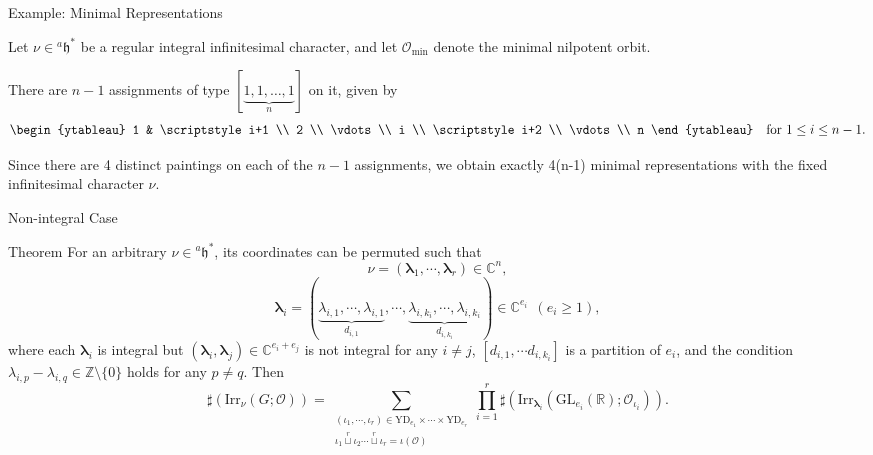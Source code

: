 \documentclass[fleqn,xcolor=dvipsnames]{beamer}
\newcommand{\blam}{{\boldsymbol{\lambda}}}
\newcommand{\BC}{{\mathbb {C}}}
\newcommand{\BR}{{\mathbb {R}}}
\newcommand{\BZ}{{\mathbb {Z}}}
\newcommand{\CO}{{\mathcal {O}}}
\newcommand{\fh}{\mathfrak{h}}
\newcommand{\GL}{{\mathrm{GL}}}
\newcommand{\Irr}{{\mathrm{Irr}}}
\begin{document}
\begin{frame}{Example: Minimal Representations}

Let \( \nu \in {^a\mathfrak{h}}^* \) be a regular integral infinitesimal character, and let \( \mathcal{O}_{\mathrm{min}} \) denote the minimal nilpotent orbit.

\medskip

There are \( n-1 \) assignments of type \( [\underbrace{1, 1, \dots, 1}_n] \) on it, given by
\[
\begin{ytableau}
    1 & \scriptstyle i+1 \\
    2 \\
    \vdots \\
    i \\
    \scriptstyle i+2 \\
    \vdots \\
    n
\end{ytableau}
\quad \text{for } 1 \leq i \leq n-1.
\]

\medskip

Since there are 4 distinct paintings on each of the \( n-1 \) assignments, we obtain exactly \alert{4(n-1) minimal representations}   with the fixed infinitesimal character \( \nu \).

\end{frame}






\begin{frame}{Non-integral Case}
  \begin{block}{Theorem}
    For an arbitrary $\nu \in {^{a}\fh}^*$, its coordinates can be permuted such that 
        \[
        \nu = (\blam_1, \cdots, \blam_r) \in \BC^n,
        \]
        \[
        \blam_i = (\underbrace{\lambda_{i,1}, \cdots, \lambda_{i,1}}_{d_{i,1}}, \cdots, \underbrace{\lambda_{i,k_i}, \cdots, \lambda_{i,k_i}}_{d_{i,k_i}}) \in \BC^{e_i} \ \ (e_i \geq 1),
        \]  
        where each $\blam_i$ is integral but $(\blam_i,\blam_j) \in \BC^{e_i+e_j}$ is not integral for any $i \neq j$, $[d_{i,1}, \cdots d_{i,k_i} ]$ is a partition of $e_i$, and the condition $\lambda_{i,p} - \lambda_{i,q} \in \BZ \setminus \{0\}$ holds for any $p \neq q$. Then
        \begin{equation*}
            \sharp(\Irr_{\nu}(G;\CO)) = \sum_{\substack{(\iota_1,\cdots,\iota_r) \in \mathrm{YD}_{e_1} \times \cdots \times \mathrm{YD}_{e_r} \\ \iota_1 \mathop{\sqcup}\limits^r \iota_2 \cdots \mathop{\sqcup}\limits^r  \iota_r = \iota(\CO) }}\prod_{i=1}^{r}\sharp(\Irr_{\blam_i}(\GL_{e_i}(\BR);\CO_{\iota_i})).
        \end{equation*}
  \end{block}
\end{frame}
\end{document}
